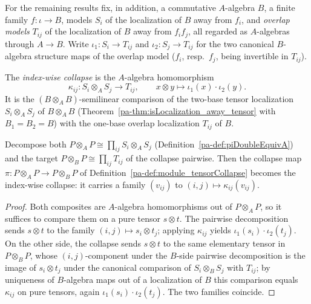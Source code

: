For the remaining results fix, in addition, a commutative \(A\)-algebra \(B\), a finite
family \(f \colon \iota \to B\), models \(S_i\) of the localization of \(B\) away from
\(f_i\), and \emph{overlap models} \(T_{ij}\) of the localization of \(B\) away from
\(f_i f_j\), all regarded as \(A\)-algebras through \(A \to B\). Write
\(\iota_1 \colon S_i \to T_{ij}\) and \(\iota_2 \colon S_j \to T_{ij}\) for the two canonical
\(B\)-algebra structure maps of the overlap model (\(f_i\), resp.\ \(f_j\), being invertible
in \(T_{ij}\)).

\begin{definition}
  \label{pa-def:componentCollapse}
  \leanok

  The \emph{index-wise collapse} is the \(A\)-algebra homomorphism
  \[
    \kappa_{ij} \colon S_i \otimes_A S_j \longrightarrow T_{ij}, \qquad
    x \otimes y \mapsto \iota_1(x) \cdot \iota_2(y) .
  \]
  It is the \((B \otimes_A B)\)-semilinear comparison of the two-base tensor localization
  \(S_i \otimes_A S_j\) of \(B \otimes_A B\) (Theorem~\ref{pa-thm:isLocalization_away_tensor}
  with \(B_1 = B_2 = B\)) with the one-base overlap localization \(T_{ij}\) of \(B\).
\end{definition}

\begin{lemma}
  \label{pa-lem:piDoubleEquiv_tensorCollapse}
  \leanok

  Decompose both \(P \otimes_A P \cong \prod_{ij} S_i \otimes_A S_j\)
  (Definition~\ref{pa-def:piDoubleEquivA}) and the target
  \(P \otimes_B P \cong \prod_{ij} T_{ij}\) of the collapse pairwise. Then the collapse map
  \(\pi \colon P \otimes_A P \to P \otimes_B P\) of
  Definition~\ref{pa-def:module_tensorCollapse} becomes the index-wise collapse: it carries a
  family \((v_{ij})\) to \((i,j) \mapsto \kappa_{ij}(v_{ij})\).
\end{lemma}
\begin{proof}
  \leanok
  Both composites are \(A\)-algebra homomorphisms out of \(P \otimes_A P\), so it suffices to
  compare them on a pure tensor \(s \otimes t\). The pairwise decomposition sends
  \(s \otimes t\) to the family \((i,j) \mapsto s_i \otimes t_j\); applying \(\kappa_{ij}\)
  yields \(\iota_1(s_i) \cdot \iota_2(t_j)\). On the other side, the collapse sends
  \(s \otimes t\) to the same elementary tensor in \(P \otimes_B P\), whose \((i,j)\)-component
  under the \(B\)-side pairwise decomposition is the image of \(s_i \otimes t_j\) under the
  canonical comparison of \(S_i \otimes_B S_j\) with \(T_{ij}\); by uniqueness of \(B\)-algebra
  maps out of a localization of \(B\) this comparison equals \(\kappa_{ij}\) on pure tensors,
  again \(\iota_1(s_i) \cdot \iota_2(t_j)\). The two families coincide.
\end{proof}

